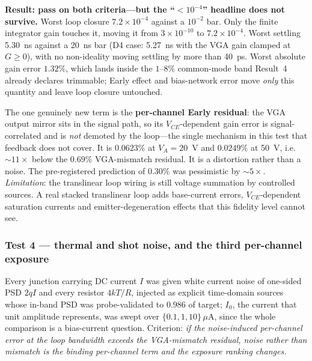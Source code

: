 \documentclass[11pt]{article}
\begin{document}
\textbf{Result: pass on both criteria---but the ``$<10^{-4}$'' headline does not survive.} Worst loop closure $7.2\times10^{-4}$ against a $10^{-2}$ bar. Only the finite integrator gain touches it, moving it from $3\times10^{-10}$ to $7.2\times10^{-4}$. Worst settling 5.30~ns against a 20~ns bar (D4 case: 5.27~ns with the VGA gain clamped at $G \ge 0$), with no non-ideality moving settling by more than 40~ps. Worst absolute gain error $1.32\%$, which lands inside the $1$--$8\%$ common-mode band Result~4 already declares trimmable; Early effect and bias-network error move \textit{only} this quantity and leave loop closure untouched.

The one genuinely new term is the \textbf{per-channel Early residual}: the VGA output mirror sits in the signal path, so its $V_{CE}$-dependent gain error is signal-correlated and is \textit{not} demoted by the loop---the single mechanism in this test that feedback does not cover. It is $0.0623\%$ at $V_A = 20$~V and $0.0249\%$ at 50~V, i.e.\ ${\sim}11\times$ below the $0.69\%$ VGA-mismatch residual. It is a distortion rather than a noise. The pre-registered prediction of $0.30\%$ was pessimistic by ${\sim}5\times$. \textit{Limitation}: the translinear loop wiring is still voltage summation by controlled sources. A real stacked translinear loop adds base-current errors, $V_{CE}$-dependent saturation currents and emitter-degeneration effects that this fidelity level cannot see.

\subsubsection{Test 4 --- thermal and shot noise, and the third per-channel exposure}
\label{sec:noise}

Every junction carrying DC current $I$ was given white current noise of one-sided PSD $2qI$ and every resistor $4kT/R$, injected as explicit time-domain sources whose in-band PSD was probe-validated to $0.986$ of target; $I_0$, the current that unit amplitude represents, was swept over $\{0.1, 1, 10\}\,\mu$A, since the whole comparison is a bias-current question. Criterion: \textit{if the noise-induced per-channel error at the loop bandwidth exceeds the VGA-mismatch residual, noise rather than mismatch is the binding per-channel term and the exposure ranking changes.}
\end{document}
